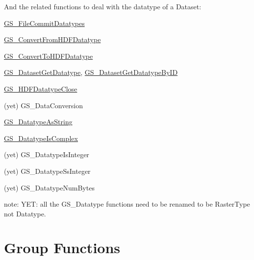 And the related functions to deal with the datatype of a Dataset\+: \begin{DoxyItemize}
\item \hyperlink{hdf5mine_8h_aa13c5ff736ee379862601c0b7704c58c}{G\+S\+\_\+\+File\+Commit\+Datatypes} \item \hyperlink{hdf5mine_8h_ab450cfcb4cec9d09153d63bd4cf5d697}{G\+S\+\_\+\+Convert\+From\+H\+D\+F\+Datatype} \item \hyperlink{hdf5mine_8h_adda18a93c5b245ba8848b73cc28add9b}{G\+S\+\_\+\+Convert\+To\+H\+D\+F\+Datatype} \item \hyperlink{hdf5mine_8h_aceeb9596f55ad32a66123ac887c2c434}{G\+S\+\_\+\+Dataset\+Get\+Datatype}, \hyperlink{hdf5mine_8h_a7e5dcc0fb2c14128f3cae98f378343ca}{G\+S\+\_\+\+Dataset\+Get\+Datatype\+By\+I\+D} \item \hyperlink{hdf5mine_8h_a1caf38d5d8079e8f27d872f90388f856}{G\+S\+\_\+\+H\+D\+F\+Datatype\+Close} \item (yet) G\+S\+\_\+\+Data\+Conversion \item \hyperlink{hdf5mine_8h_aa4771ad431f7e00869566ecdb2b2520b}{G\+S\+\_\+\+Datatype\+As\+String} \item \hyperlink{hdf5mine_8h_a06f9bc1db501d6aca19778e429b29e15}{G\+S\+\_\+\+Datatype\+Is\+Complex} \item (yet) G\+S\+\_\+\+Datatype\+Is\+Integer \item (yet) G\+S\+\_\+\+Datatype\+Ss\+Integer \item (yet) G\+S\+\_\+\+Datatype\+Num\+Bytes\end{DoxyItemize}
note\+: Y\+E\+T\+: all the G\+S\+\_\+\+Datatype functions need to be renamed to be Raster\+Type not Datatype.\hypertarget{hdf_library_hdf_group_functions}{}\section{Group Functions}\label{hdf_library_hdf_group_functions}

